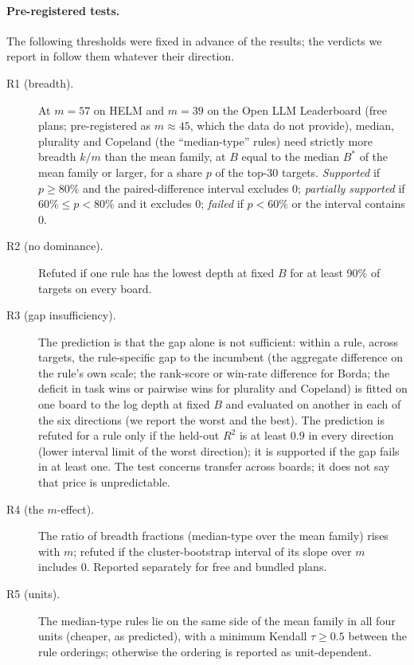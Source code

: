 \paragraph{Pre-registered tests.}
The following thresholds were fixed in advance of the results; the verdicts we report in  follow them whatever their direction.
\begin{description}
\item[R1 (breadth).] At $m=57$ on HELM and $m=39$ on the Open LLM Leaderboard (free plans; pre-registered as $m\approx45$, which the data do not provide), median, plurality and Copeland (the ``median-type'' rules) need strictly more breadth $k/m$ than the mean family, at $B$ equal to the median $B^\ast$ of the mean family or larger, for a share $p$ of the top-30 targets. \emph{Supported} if $p\ge80\%$ and the paired-difference interval excludes 0; \emph{partially supported} if $60\%\le p<80\%$ and it excludes 0; \emph{failed} if $p<60\%$ or the interval contains 0.
\item[R2 (no dominance).] Refuted if one rule has the lowest depth at fixed $B$ for at least 90\% of targets on every board.
\item[R3 (gap insufficiency).] The prediction is that the gap alone is not sufficient: within a rule, across targets, the rule-specific gap to the incumbent (the aggregate difference on the rule's own scale; the rank-score or win-rate difference for Borda; the deficit in task wins or pairwise wins for plurality and Copeland) is fitted on one board to the log depth at fixed $B$ and evaluated on another in each of the six directions (we report the worst and the best). The prediction is refuted for a rule only if the held-out $R^2$ is at least $0.9$ in every direction (lower interval limit of the worst direction); it is supported if the gap fails in at least one. The test concerns transfer across boards; it does not say that price is unpredictable.
\item[R4 (the $m$-effect).] The ratio of breadth fractions (median-type over the mean family) rises with $m$; refuted if the cluster-bootstrap interval of its slope over $m$ includes 0. Reported separately for free and bundled plans.
\item[R5 (units).] The median-type rules lie on the same side of the mean family in all four units (cheaper, as predicted), with a minimum Kendall $\tau\ge0.5$ between the rule orderings; otherwise the ordering is reported as unit-dependent.
\end{description}
